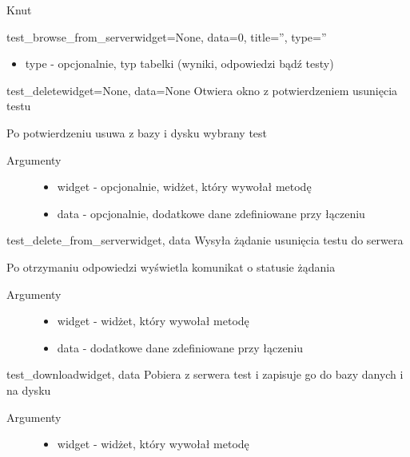 \documentclass[letterpaper,10pt,polish]{manual}
\begin{document}
\begin{classdesc}{Knut}{}
\begin{methoddesc}{test\_browse\_from\_server}{widget=None, data=0, title='', type=''}
\begin{description}
\begin{itemize}
\item {} 
type - opcjonalnie, typ tabelki (wyniki, odpowiedzi bądź testy)

\end{itemize}

\end{description}
\end{methoddesc}

\hypertarget{Knut.Knut.test\_delete}{}\begin{methoddesc}{test\_delete}{widget=None, data=None}
Otwiera okno z potwierdzeniem usunięcia testu

Po potwierdzeniu usuwa z bazy i dysku wybrany test
\begin{description}
\item[Argumenty] \leavevmode\begin{itemize}
\item {} 
widget - opcjonalnie, widżet, który wywołał metodę

\item {} 
data  - opcjonalnie, dodatkowe dane zdefiniowane przy łączeniu

\end{itemize}

\end{description}
\end{methoddesc}

\hypertarget{Knut.Knut.test\_delete\_from\_server}{}\begin{methoddesc}{test\_delete\_from\_server}{widget, data}
Wysyła żądanie usunięcia testu do serwera

Po otrzymaniu odpowiedzi wyświetla komunikat o statusie żądania
\begin{description}
\item[Argumenty] \leavevmode\begin{itemize}
\item {} 
widget - widżet, który wywołał metodę

\item {} 
data  - dodatkowe dane zdefiniowane przy łączeniu

\end{itemize}

\end{description}
\end{methoddesc}

\hypertarget{Knut.Knut.test\_download}{}\begin{methoddesc}{test\_download}{widget, data}
Pobiera z serwera test i zapisuje go do bazy danych i na dysku
\begin{description}
\item[Argumenty] \leavevmode\begin{itemize}
\item {} 
widget - widżet, który wywołał metodę


\end{itemize}
\end{description}
\end{methoddesc}
\end{classdesc}
\end{document}
